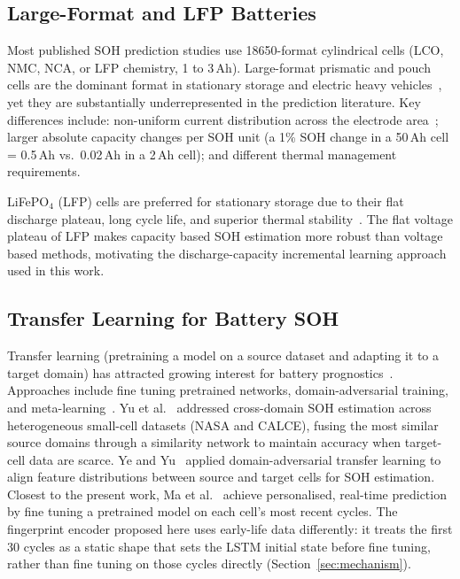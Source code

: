 \subsection{Large-Format and LFP Batteries}

Most published SOH prediction studies use 18650-format cylindrical cells
(LCO, NMC, NCA, or LFP chemistry, 1 to 3\,Ah).
Large-format prismatic and pouch cells are the dominant format in stationary
storage and electric heavy vehicles~\cite{barai2015comparison}, yet they
are substantially underrepresented in the prediction literature.
Key differences include: non-uniform current distribution across the
electrode area~\cite{forgez2010thermal}; larger absolute capacity changes
per SOH unit (a 1\% SOH change in a 50\,Ah cell = 0.5\,Ah vs.\ 0.02\,Ah
in a 2\,Ah cell); and different thermal management requirements.

LiFePO$_4$ (LFP) cells are preferred for stationary storage due to their
flat discharge plateau, long cycle life, and superior thermal
stability~\cite{barai2015comparison}.
The flat voltage plateau of LFP makes capacity based SOH estimation more
robust than voltage based methods, motivating the discharge-capacity
incremental learning approach used in this work.

\subsection{Transfer Learning for Battery SOH}

Transfer learning (pretraining a model on a source dataset and adapting
it to a target domain) has attracted growing interest for battery
prognostics~\cite{severson2019data}.
Approaches include fine tuning pretrained networks, domain-adversarial
training, and meta-learning~\cite{finn2017model}.
Yu et al.~\cite{yu2026crossdomain} addressed cross-domain SOH estimation across
heterogeneous small-cell datasets (NASA and CALCE), fusing the most similar
source domains through a similarity network to maintain accuracy when
target-cell data are scarce.
Ye and Yu~\cite{ye2021state} applied domain-adversarial transfer learning to
align feature distributions between source and target cells for SOH estimation.
Closest to the present work, Ma et al.~\cite{ma2022real} achieve personalised,
real-time prediction by fine tuning a pretrained model on each cell's most
recent cycles.
The fingerprint encoder proposed here uses early-life data differently: it
treats the first 30 cycles as a static shape that sets the LSTM initial state
before fine tuning, rather than fine tuning on those cycles directly
(Section~\ref{sec:mechanism}).

